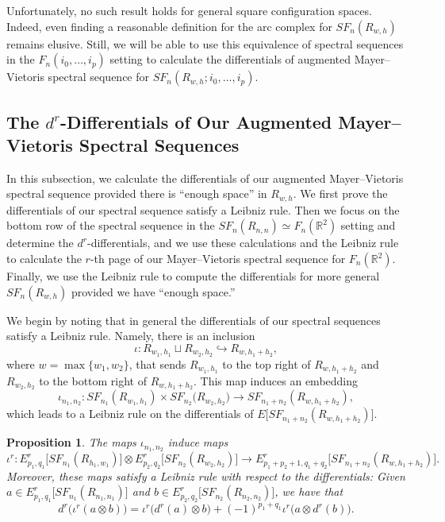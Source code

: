 \documentclass[pagebackref,colorlinks,citecolor=blue,linkcolor=blue,urlcolor=blue,filecolor=blue]{article}
\newtheorem{prop}[thm]{Proposition}
\theoremstyle{definition}\newtheorem{definition}[thm]{Definition}
\theoremstyle{definition}
\newcommand{\R}{\ensuremath{\mathbb{R}}}
\begin{document}
Unfortunately, no such result holds for general square configuration spaces. 
Indeed, even finding a reasonable definition for the arc complex for $SF_{n}(R_{w,h})$ remains elusive.
Still, we will be able to use this equivalence of spectral sequences in the $F_{n}(i_{0}, \dots, i_{p})$ setting to calculate the differentials of augmented Mayer--Vietoris spectral sequence for $SF_{n}(R_{w,h}; i_{0}, \dots, i_{p})$.

\subsection{The $d^{r}$-Differentials of Our Augmented Mayer--Vietoris Spectral Sequences}

In this subsection, we calculate the differentials of our augmented Mayer--Vietoris spectral sequence provided there is ``enough space'' in $R_{w,h}$.
We first prove the differentials of our spectral sequence satisfy a Leibniz rule.
Then we focus on the bottom row of the spectral sequence in the $SF_{n}(R_{n, n})\simeq F_{n}(\R^{2})$ setting and determine the $d^{r}$-differentials, and we use these calculations and the Leibniz rule to calculate the $r$-th page of our Mayer--Vietoris spectral sequence for $F_{n}(\R^{2})$.
Finally, we use the Leibniz rule to compute the differentials for more general $SF_{n}(R_{w, h})$ provided we have ``enough space.''

We begin by noting that in general the differentials of our spectral sequences satisfy a Leibniz rule.
Namely, there is an inclusion
\[
\iota:R_{w_{1}, h_{1}}\sqcup R_{w_{2}, h_{2}}\hookrightarrow R_{w, h_{1}+h_{2}},
\]
where $w=\max\{w_{1}, w_{2}\}$, that sends $R_{w_{1}, h_{1}}$ to the top right of $R_{w, h_{1}+h_{2}}$ and $R_{w_{2}, h_{2}}$ to the bottom right of $R_{w, h_{1}+h_{2}}$.
This map induces an embedding
\[
\iota_{n_{1}, n_{2}}:SF_{n_{1}}(R_{w_{1}, h_{1}})\times SF_{n_{2}}(R_{w_{2}, h_{2}}\big)\to SF_{n_{1}+n_{2}}(R_{w, h_{1}+h_{2}}),
\]
which leads to a Leibniz rule on the differentials of $E\big[SF_{n_{1}+n_{2}}(R_{w, h_{1}+h_{2}})\big]$.

\begin{prop}\label{Leibniz Rule}
The maps $\iota_{n_{1}, n_{2}}$ induce maps
\[
\iota^{r}:E^{r}_{p_{1},q_{1}}\big[SF_{n_{1}}(R_{h_{1}, w_{1}})\big]\otimes E^{r}_{p_{2},q_{2}}\big[SF_{n_{2}}(R_{w_{2}, h_{2}})\big]\to E^{r}_{p_{1}+p_{2}+1, q_{1}+q_{2}}\big[SF_{n_{1}+n_{2}}(R_{w, h_{1}+h_{2}})\big].
\]
Moreover, these maps satisfy a Leibniz rule with respect to the differentials: Given $a\in E^{r}_{p_{1},q_{1}}\big[SF_{n_{1}}(R_{n_{1}, n_{1}})\big]$ and $b\in E^{r}_{p_{2},q_{2}}\big[SF_{n_{2}}(R_{n_{2}, n_{2}})\big]$, we have that
\[
d^{r}\big(\iota^{r}(a\otimes b)\big)=\iota^{r}\big(d^{r}(a)\otimes b\big)+(-1)^{p_{1}+q_{1}}\iota^{r}\big(a\otimes d^{r}(b)\big).
\]
\end{prop}
\end{document}

